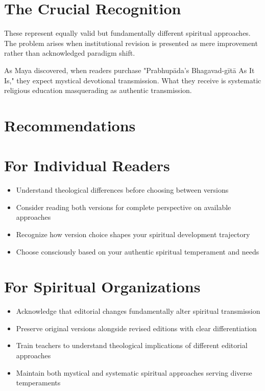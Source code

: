 \documentclass[11pt,twoside]{book}
\begin{document}
\section*{The Crucial Recognition}
\label{sec:orgdbc77ec}

These represent equally valid but fundamentally different spiritual approaches. The problem arises when institutional revision is presented as mere improvement rather than acknowledged paradigm shift.

As Maya discovered, when readers purchase "Prabhupāda's Bhagavad-gītā As It Is," they expect mystical devotional transmission. What they receive is systematic religious education masquerading as authentic transmission.
\section*{Recommendations}
\label{sec:orgcdafba8}

\section*{For Individual Readers}
\label{sec:org118f8d4}
\begin{itemize}
\item Understand theological differences before choosing between versions
\item Consider reading both versions for complete perspective on available approaches
\item Recognize how version choice shapes your spiritual development trajectory
\item Choose consciously based on your authentic spiritual temperament and needs
\end{itemize}
\section*{For Spiritual Organizations}
\label{sec:org001ba29}
\begin{itemize}
\item Acknowledge that editorial changes fundamentally alter spiritual transmission
\item Preserve original versions alongside revised editions with clear differentiation
\item Train teachers to understand theological implications of different editorial approaches
\item Maintain both mystical and systematic spiritual approaches serving diverse temperaments
\end{itemize}
\end{document}
